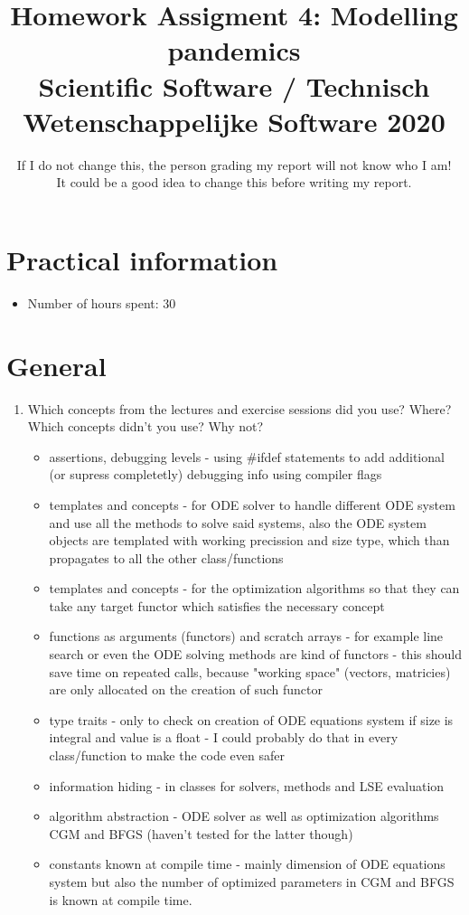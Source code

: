 \documentclass[a4paper]{article}
\title{Homework Assigment 4: Modelling pandemics \\ \large Scientific Software / Technisch Wetenschappelijke Software 2020}
\author{If I do not change this, the person grading my report will not know who I am!\\ It could be a good idea to change this before writing my report.}
\newcommand{\answer}[1]{\vspace{-0.75em}\begin{framed} #1 \end{framed}\vspace{-0.75em}}
\begin{document}
\maketitle
\section*{Practical information}
\begin{itemize}
	\item Number of hours spent: 30
\end{itemize}


\section*{General}
\begin{enumerate}
	\item Which concepts from the lectures and exercise sessions did you use? Where? Which concepts didn't you use? Why not?
	\answer{
		
	\begin{itemize}
		\item assertions, debugging levels - using \#ifdef statements to add additional (or supress completetly) debugging info using compiler flags
		\item templates and concepts - for ODE solver to handle different ODE system and use all the methods to solve said systems, also the ODE system objects are templated with working precission and size type, which than propagates to all the other class/functions
		\item templates and concepts - for the optimization algorithms so that they can take any target functor which satisfies the necessary concept
		\item functions as arguments (functors) and scratch arrays - for example line search or even the ODE solving methods are kind of functors - this should save time on repeated calls, because "working space" (vectors, matricies) are only allocated on the creation of such functor
		\item type traits - only to check on creation of ODE equations system if size is integral and value is a float - I could probably do that in every class/function to make the code even safer
		\item information hiding - in classes for solvers, methods and LSE evaluation
		\item algorithm abstraction - ODE solver as well as optimization algorithms CGM and BFGS (haven't tested for the latter though)
		\item constants known at compile time - mainly dimension of ODE equations system but also the number of optimized parameters in CGM and BFGS is known at compile time.
	

\end{itemize}}
\end{enumerate}
\end{document}
